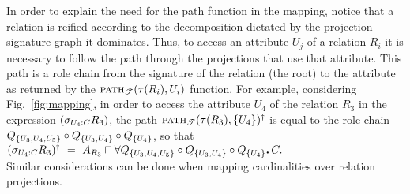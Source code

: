 \documentclass[envcountsame,draft]{llncs}
\newcommand{\per}{\mathpunct{\mbox{\bf .}}}
\newcommand{\pth}[2]{\ensuremath{\textsc{path}_{\mathscr{T}}(#1,#2)}\xspace}
\begin{document}
In order to explain the need for the path function in the mapping,
notice that a relation is reified according to the decomposition
dictated by the projection signature graph it dominates. Thus, to
access an attribute $U_j$ of a relation ${R_i}$ it is necessary to
follow the path through the projections that use that attribute. This
path is a role chain from the signature of the relation (the root) to
the attribute as returned by the $\pth{\tau(R_i)}{U_i}$ function. For
example, considering Fig.~\ref{fig:mapping}, in order to access the
attribute $U_4$ of the relation $R_3$ in the expression
$(\sigma_{U_4 : C} R_3)$, the path $\pth{\tau(R_3)}{\{U_4\}}^\dag$ is
equal to the role chain
$Q_{\{U_3,U_4,U_5\}}\circ Q_{\{U_3,U_4\}}\circ Q_{\{U_4\}}$, so that
$ (\selects{U_4}{C}{R_3})^\dag ~=~ A_{R_3} \sqcap \forall
Q_{\{U_3,U_4,U_5\}}\chain Q_{\{U_3,U_4\}}\chain Q_{\{U_4\}}\per C.  $
\\
Similar considerations can be done when mapping cardinalities over
relation projections.
\end{document}
